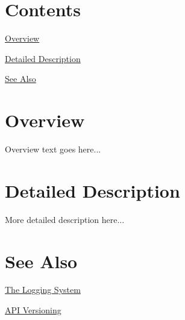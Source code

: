 \hypertarget{index_sec_Contents}{}\section{Contents}\label{index_sec_Contents}
\begin{DoxyItemize}
\item \hyperlink{index_sec_Overview}{Overview} \item \hyperlink{index_sec_Detail}{Detailed Description} \item \hyperlink{index_sec_SeeAlso}{See Also}\end{DoxyItemize}
\hypertarget{index_sec_Overview}{}\section{Overview}\label{index_sec_Overview}
Overview text goes here...\hypertarget{index_sec_Detail}{}\section{Detailed Description}\label{index_sec_Detail}
More detailed description here...\hypertarget{index_sec_SeeAlso}{}\section{See Also}\label{index_sec_SeeAlso}
\begin{DoxyItemize}
\item \hyperlink{page_Logging}{The Logging System} \item \hyperlink{page_Versioning}{A\+PI Versioning} \end{DoxyItemize}
